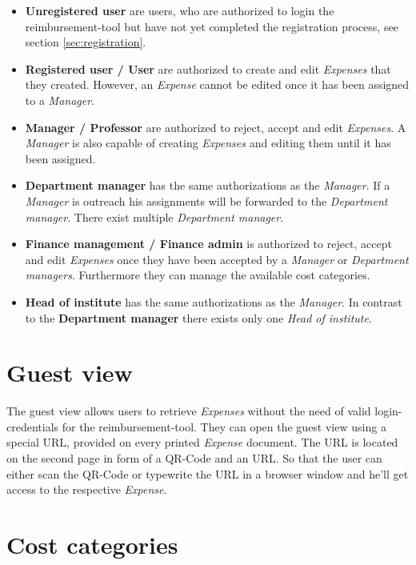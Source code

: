 \begin{itemize}
    \item \textbf{Unregistered user} are users, who are authorized to login the reimbursement-tool but have not yet completed the registration process, see section \ref{sec:registration}.
    \item \textbf{Registered user / User} are authorized to create and edit \textit{Expenses} that they created. However, an \textit{Expense} cannot be edited once it has been assigned to a \textit{Manager}.
    
    \item \textbf{Manager / Professor} are authorized to reject, accept and edit \textit{Expenses}. A \textit{Manager} is also capable of creating \textit{Expenses} and editing them until it has been assigned. 
    
    \item \textbf{Department manager} has the same authorizations as the \textit{Manager}. If a \textit{Manager} is outreach his assignments will be forwarded to the \textit{Department manager}. There exist multiple \textit{Department manager}.
    
    \item \textbf{Finance management / Finance admin} is authorized to reject, accept and edit \textit{Expenses} once they have been accepted by a \textit{Manager} or \textit{Department managers}. Furthermore they can manage the available cost categories.
    
    \item \textbf{Head of institute} has the same authorizations as the \textit{Manager}. In contrast to the \textbf{Department manager} there exists only one \textit{Head of institute}.
\end{itemize}

\section{Guest view}
The guest view allows users to retrieve \textit{Expenses} without the need of valid login-credentials for the reimbursement-tool. They can open the guest view using a special URL, provided on every printed \textit{Expense} document. The URL is located on the second page in form of a QR-Code and an URL. So that the user can either scan the QR-Code or typewrite the URL in a browser window and he'll get access to the respective \textit{Expense}.

\section{Cost categories}

